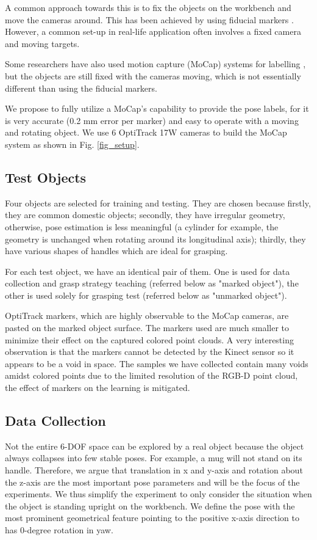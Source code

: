 \documentclass[conference]{IEEEtran}
\begin{document}
A common approach towards this is to fix the objects on the workbench and move the cameras around. This has been achieved by using fiducial markers \cite{brachmann_2014_eccv}. However, a common set-up in real-life application often involves a fixed camera and moving targets.

Some researchers have also used motion capture (MoCap) systems for labelling \cite{wong_2017_iros}, but the objects are still fixed with the cameras moving, which is not essentially different than using the fiducial markers.

We propose to fully utilize a MoCap's capability to provide the pose labels, for it is very accurate (0.2 mm error per marker) and easy to operate with a moving and rotating object. We use 6 OptiTrack 17W cameras to build the MoCap system as shown in Fig. \ref{fig_setup}.

\subsection{Test Objects}
Four objects are selected for training and testing. They are chosen because firstly, they are common domestic objects; secondly, they have irregular geometry, otherwise, pose estimation is less meaningful (a cylinder for example, the geometry is unchanged when rotating around its longitudinal axis); thirdly, they have various shapes of handles which are ideal for grasping.

For each test object, we have an identical pair of them. One is used for data collection and grasp strategy teaching (referred below as "marked object"), the other is used solely for grasping test (referred below as "unmarked object").

OptiTrack markers, which are highly observable to the MoCap cameras, are pasted on the marked object surface. The markers used are much smaller to minimize their effect on the captured colored point clouds. A very interesting observation is that the markers cannot be detected by the Kinect sensor so it appears to be a void in space. The samples we have collected contain many voids amidst colored points due to the limited resolution of the RGB-D point cloud, the effect of markers on the learning is mitigated.

\subsection{Data Collection}
Not the entire 6-DOF space can be explored by a real object because the object always collapses into few stable poses. For example, a mug will not stand on its handle. Therefore, we argue that translation in x and y-axis and rotation about the z-axis are the most important pose parameters and will be the focus of the experiments. We thus simplify the experiment to only consider the situation when the object is standing upright on the workbench. We define the pose with the most prominent geometrical feature pointing to the positive x-axis direction to has 0-degree rotation in yaw.
\end{document}
